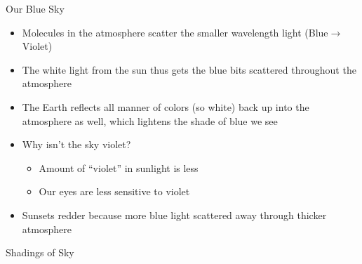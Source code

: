 \documentclass[pdf,aspectratio=169]{beamer}
\begin{document}
\begin{frame}{Our Blue Sky}
  \begin{itemize}
	\item Molecules in the atmosphere scatter the smaller wavelength light (Blue$\rightarrow$Violet)
	\item The white light from the sun thus gets the blue bits scattered throughout the atmosphere
	\item The Earth reflects all manner of colors (so white) back up into the atmosphere as well, which lightens the shade of blue we see
	\item Why isn't the sky violet?
	  \begin{itemize}
		\item Amount of ``violet'' in sunlight is less
		\item Our eyes are less sensitive to violet
	  \end{itemize}
	\item Sunsets redder because more blue light scattered away through thicker atmosphere
  \end{itemize}
\end{frame}

\begin{frame}{Shadings of Sky}
  \begin{center}
  \end{center}
\end{frame}


\end{document}
